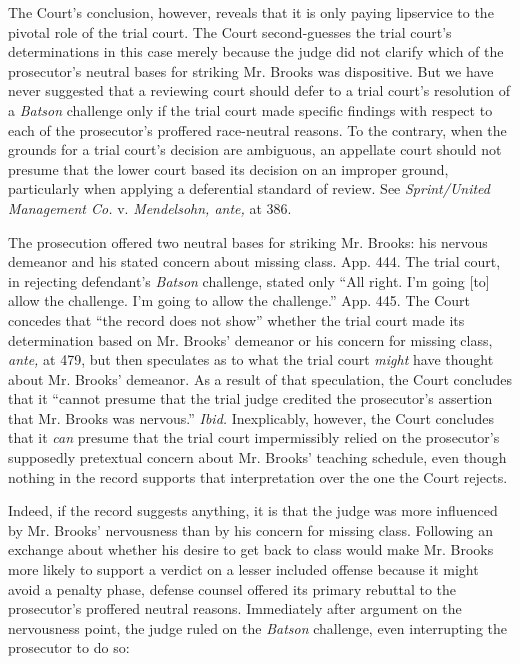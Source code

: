   The Court's conclusion, however, reveals that it is only paying
lipservice to the pivotal role of the trial court. The Court
second-guesses the trial court's determinations in this case merely
because the judge did not clarify which of the prosecutor's neutral
bases for striking Mr. Brooks was dispositive. But we have never
suggested that a reviewing court should defer to a trial court's
resolution of a \emph{Batson} challenge only if the trial court made
specific findings with respect to each of the prosecutor's proffered
race-neutral reasons. To the contrary, when the grounds for a trial
court's decision are ambiguous, an appellate court should not
presume that the lower court based its decision on an improper ground,
particularly when applying a deferential standard of review. See
\emph{Sprint/United Management Co.} v. \emph{Mendelsohn, ante,} at 386.

  The prosecution offered two neutral bases for striking Mr. Brooks:
his nervous demeanor and his stated concern about missing class. App.
444. The trial court, in rejecting \newpage  defendant's \emph{Batson}
challenge, stated only ``All right. I'm going [to] allow the
challenge. I'm going to allow the challenge.'' App. 445. The Court
concedes that ``the record does not show'' whether the trial court
made its determination based on Mr. Brooks' demeanor or his concern
for missing class, \emph{ante,} at 479, but then speculates as to what
the trial court \emph{might} have thought about Mr. Brooks' demeanor.
As a result of that speculation, the Court concludes that it ``cannot
presume that the trial judge credited the prosecutor's assertion
that Mr. Brooks was nervous.'' \emph{Ibid.} Inexplicably, however,
the Court concludes that it \emph{can} presume that the trial court
impermissibly relied on the prosecutor's supposedly pretextual concern
about Mr. Brooks' teaching schedule, even though nothing in the record
supports that interpretation over the one the Court rejects.

  Indeed, if the record suggests anything, it is that the judge was more
influenced by Mr. Brooks' nervousness than by his concern for missing
class. Following an exchange about whether his desire to get back to
class would make Mr. Brooks more likely to support a verdict on a lesser
included offense because it might avoid a penalty phase, defense counsel
offered its primary rebuttal to the prosecutor's proffered neutral
reasons. Immediately after argument on the nervousness point, the judge
ruled on the \emph{Batson} challenge, even interrupting the prosecutor to
do so:

